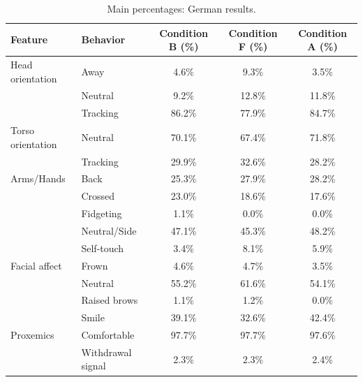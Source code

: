 \begin{table}[!ht]
\centering
\begin{tabular}{llccc}
\toprule
Feature & Behavior & Condition B (\%) & Condition F (\%) & Condition A (\%) \\
\midrule
Head orientation & Away & 4.6\% & 9.3\% & 3.5\% \\
~ & Neutral & 9.2\% & 12.8\% & 11.8\% \\
~ & Tracking & 86.2\% & 77.9\% & 84.7\% \\
\midrule
Torso orientation & Neutral & 70.1\% & 67.4\% & 71.8\% \\
~ & Tracking & 29.9\% & 32.6\% & 28.2\% \\
\midrule
Arms/Hands & Back & 25.3\% & 27.9\% & 28.2\% \\
~ & Crossed & 23.0\% & 18.6\% & 17.6\% \\
~ & Fidgeting & 1.1\% & 0.0\% & 0.0\% \\
~ & Neutral/Side & 47.1\% & 45.3\% & 48.2\% \\
~ & Self-touch & 3.4\% & 8.1\% & 5.9\% \\
\midrule
Facial affect & Frown & 4.6\% & 4.7\% & 3.5\% \\
~ & Neutral & 55.2\% & 61.6\% & 54.1\% \\
~ & Raised brows & 1.1\% & 1.2\% & 0.0\% \\
~ & Smile & 39.1\% & 32.6\% & 42.4\% \\
\midrule
Proxemics & Comfortable & 97.7\% & 97.7\% & 97.6\% \\
~ & Withdrawal signal & 2.3\% & 2.3\% & 2.4\% \\
\bottomrule
\end{tabular}
\caption{Main percentages: German results.}
\label{tab:main_pct_german}
\end{table}

